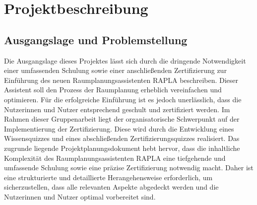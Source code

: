 \chapter{Projektbeschreibung}
\section{Ausgangslage und Problemstellung}
Die Ausgangslage dieses Projektes lässt sich durch die dringende Notwendigkeit einer umfassenden Schulung sowie einer anschließenden Zertifizierung zur Einführung des neuen Raumplanungsassistenten RAPLA beschreiben. Dieser Assistent soll den Prozess der Raumplanung erheblich vereinfachen und optimieren. Für die erfolgreiche Einführung ist es jedoch unerlässlich, dass die Nutzerinnen und Nutzer entsprechend geschult und zertifiziert werden. Im Rahmen dieser Gruppenarbeit liegt der organisatorische Schwerpunkt auf der Implementierung der Zertifizierung. Diese wird durch die Entwicklung eines Wissensquizzes und eines abschließenden Zertifizierungsquizzes realisiert. Das zugrunde liegende Projektplanungsdokument hebt hervor, dass die inhaltliche Komplexität des Raumplanungsassistenten RAPLA eine tiefgehende und umfassende Schulung sowie eine präzise Zertifizierung notwendig macht. Daher ist eine strukturierte und detaillierte Herangehensweise erforderlich, um sicherzustellen, dass alle relevanten Aspekte abgedeckt werden und die Nutzerinnen und Nutzer optimal vorbereitet sind.

